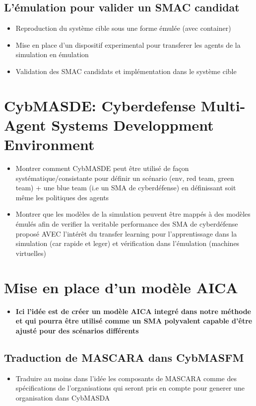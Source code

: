 \documentclass{article}
\begin{document}
\subsection{L'émulation pour valider un SMAC candidat}
\begin{itemize}

    \item Reproduction du système cible sous une forme émulée (avec container)
    \item Mise en place d'un dispositif experimental pour transferer les agents de la simulation en émulation
    \item Validation des SMAC candidats et implémentation dans le système cible

\end{itemize}


\section{CybMASDE: Cyberdefense Multi-Agent Systems Developpment Environment}
\begin{itemize}

    \item Montrer comment CybMASDE peut être utilisé de façon systématique/consistante pour définir un scénario (env, red team, green team) + une blue team (i.e un SMA de cyberdéfense) en définissant soit même les politiques des agents
    \item Montrer que les modèles de la simulation peuvent être mappés à des modèles émulés afin de verifier la veritable performance des SMA de cyberdéfense proposé AVEC l'intérêt du transfer learning pour l’apprentissage dans la simulation (car rapide et leger) et vérification dans l’émulation (machines virtuelles)
\end{itemize}



\section{Mise en place d'un modèle AICA}
\begin{itemize}

    \item \textbf{Ici l'idée est de créer un modèle AICA integré dans notre méthode et qui pourra être utilisé comme un SMA polyvalent capable d'être ajusté pour des scénarios différents}
\end{itemize}
\subsection{Traduction de MASCARA dans CybMASFM}
\begin{itemize}

    \item Traduire au moins dans l'idée les composants de MASCARA comme des spécifications de l'organisations qui seront pris en compte pour generer une organisation dans CybMASDA
\end{itemize}
\end{document}
